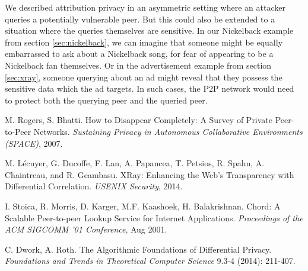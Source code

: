 \documentclass{article}
\newcommand{\secref}[1]{section \ref{sec:#1}}
\begin{document}
We described attribution privacy in an asymmetric setting where an attacker
queries a potentially vulnerable peer. But this could also be extended to a
situation where the queries themselves are sensitive. In our Nickelback example
from \secref{nickelback}, we can imagine that someone might be equally
embarrassed to ask about a Nickelback song, for fear of appearing to be a
Nickelback fan themselves. Or in the advertisement example from \secref{xray},
someone querying about an ad might reveal that they possess the sensitive data
which the ad targets. In such cases, the P2P network would need to protect both
the querying peer and the queried peer.

\begin{thebibliography}{9}

	M. Rogers, S. Bhatti.
	How to Disappear Completely: A Survey of Private Peer-to-Peer Networks.
	\emph{Sustaining Privacy in Autonomous Collaborative Environments (SPACE)}, 2007.

	M. L\'ecuyer, G. Ducoffe, F. Lan, A. Papancea, T. Petsios, R. Spahn, A. Chaintreau, and R. Geambasu.
	XRay: Enhancing the Web's Transparency with Differential Correlation.
	\emph{USENIX Security}, 2014.

	I. Stoica, R. Morris, D. Karger, M.F. Kaashoek, H. Balakrishnan.
	Chord: A Scalable Peer-to-peer Lookup Service for {Internet} Applications.
	\emph{Proceedings of the {ACM} {SIGCOMM} '01 Conference}, Aug 2001.

	C. Dwork, A. Roth.
	The Algorithmic Foundations of Differential Privacy.
	\emph{Foundations and Trends in Theoretical Computer Science} 9.3-4 (2014): 211-407.

\end{thebibliography}
\end{document}
